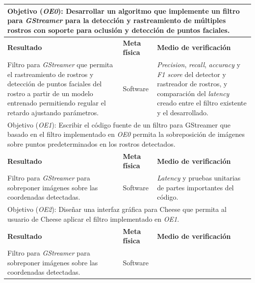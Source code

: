 \documentclass[a4paper,openright,12pt]{report}
\begin{document}
\begin{center}
  \begin{longtable}{| p{.4\linewidth} | p{.2\linewidth} | p{.3\linewidth} |}
  \hline

  \multicolumn{3}{|p{\linewidth}|}{Objetivo (\textit{OE0}): Desarrollar un algoritmo que
  implemente un filtro para \textit{GStreamer} para la detección y rastreamiento
  de múltiples rostros con soporte para oclusión y detección de puntos faciales.}
  \\ \hline

  \textbf{Resultado} &
  \textbf{Meta física} &
  \textbf{Medio de verificación}
  \\ \hline

  Filtro para \textit{GStreamer} que permita el rastreamiento de rostros y
  detección de puntos faciales del rostro a partir de un modelo entrenado 
  permitiendo regular el retardo ajustando parámetros. &
  Software &
  \textit{Precision}, \textit{recall}, \textit{accuracy} y
  \textit{F1 score} del detector y rastreador de rostros, y comparación del
  \textit{latency} creado entre el filtro existente y el desarrollado.
  \\ \hline

  \multicolumn{3}{|p{\linewidth}|}{Objetivo (\textit{OE1}): Escribir el código
  fuente de un filtro para GStreamer que basado en el filtro implementado en
  \textit{OE0} permita la sobreposición de imágenes sobre puntos predeterminados
  en los rostros detectados.}
  \\ \hline

  \textbf{Resultado} &
  \textbf{Meta física} &
  \textbf{Medio de verificación}
  \\ \hline

  Filtro para \textit{GStreamer} para sobreponer imágenes sobre las coordenadas
  detectadas. &
  Software &
  \textit{Latency} y pruebas unitarias de partes importantes del código.
  \\ \hline

  \multicolumn{3}{|p{\linewidth}|}{Objetivo (\textit{OE2}): Diseñar una interfaz
  gráfica para Cheese que permita al usuario de Cheese aplicar el filtro
  implementado en \textit{OE1}.}
  \\ \hline

  \textbf{Resultado} &
  \textbf{Meta física} &
  \textbf{Medio de verificación}
  \\ \hline

  Filtro para \textit{GStreamer} para sobreponer imágenes sobre las coordenadas
  detectadas. &
  Software
  \\ \hline
  \end{longtable}
\end{center}
\end{document}
